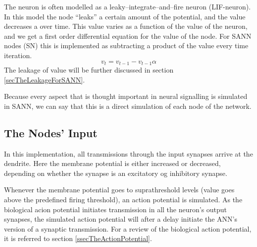 	The neuron is
					 often modelled as a leaky--integrate--and--fire neuron (LIF-neuron). %
	In this model the node ``leaks'' a certain amount of the potential, and the value decreases a over time. 
	This value varies as a function of the value of the neuron, and we get a first order differential equation for the value of the node.
	For SANN nodes (SN) this is implemented as subtracting a product of the value every time iteration. 
	\begin{equation}
	v_t = v_{t-1} - v_{t-1}  \alpha %
	\end{equation}
	The leakage of value will be further discussed in section \ref{secTheLeakageForSANN}.

	Because every aspect that is thought important in neural signalling is simulated in SANN, 
		we can say that this is a direct simulation of each node of the network.   %
	

	\subsection{The Nodes' Input}
	In this implementation, all transmissions through the input synapses arrive at the dendrite.
	Here the membrane potential is either increased or decreased, depending on whether the synapse is an excitatory og inhibitory synapse.

	Whenever the membrane potential goes to suprathreshold levels (value goes above the predefined firing threshold), an action potential is simulated.
	As the biological acion potential initiates transmission in all the neuron's output synapses, the simulated action potential will after a delay initiate the ANN's version of a synaptic transmission.
	For a review of the biological action potential, it is referred to section \ref{ssecTheActionPotential}. %
	
